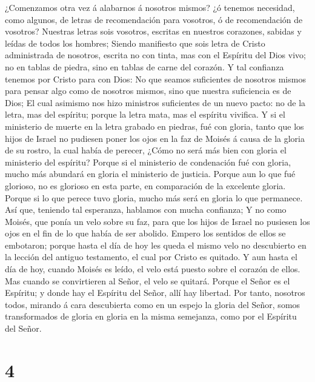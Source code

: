  ¿Comenzamos otra vez á alabarnos á nosotros mismos? ¿ó
tenemos necesidad, como algunos, de letras de recomendación para
vosotros, ó de recomendación de vosotros?  Nuestras letras
sois vosotros, escritas en nuestros corazones, sabidas y leídas de todos
los hombres;  Siendo manifiesto que sois letra de Cristo
administrada de nosotros, escrita no con tinta, mas con el Espíritu del
Dios vivo; no en tablas de piedra, sino en tablas de carne del corazón.
 Y tal confianza tenemos por Cristo para con Dios:
 No que seamos suficientes de nosotros mismos para pensar
algo como de nosotros mismos, sino que nuestra suficiencia es de Dios;
 El cual asimismo nos hizo ministros suficientes de un
nuevo pacto: no de la letra, mas del espíritu; porque la letra mata, mas
el espíritu vivifica.  Y si el ministerio de muerte en la
letra grabado en piedras, fué con gloria, tanto que los hijos de Israel
no pudiesen poner los ojos en la faz de Moisés á causa de la gloria de
su rostro, la cual había de perecer,  ¿Cómo no será más
bien con gloria el ministerio del espíritu?  Porque si el
ministerio de condenación fué con gloria, mucho más abundará en gloria
el ministerio de justicia.  Porque aun lo que fué
glorioso, no es glorioso en esta parte, en comparación de la excelente
gloria.  Porque si lo que perece tuvo gloria, mucho más
será en gloria lo que permanece.  Así que, teniendo tal
esperanza, hablamos con mucha confianza;  Y no como
Moisés, que ponía un velo sobre su faz, para que los hijos de Israel no
pusiesen los ojos en el fin de lo que había de ser abolido.
 Empero los sentidos de ellos se embotaron; porque hasta
el día de hoy les queda el mismo velo no descubierto en la lección del
antiguo testamento, el cual por Cristo es quitado.  Y aun
hasta el día de hoy, cuando Moisés es leído, el velo está puesto sobre
el corazón de ellos.  Mas cuando se convirtieren al
Señor, el velo se quitará.  Porque el Señor es el
Espíritu; y donde hay el Espíritu del Señor, allí hay libertad.
 Por tanto, nosotros todos, mirando á cara descubierta
como en un espejo la gloria del Señor, somos transformados de gloria en
gloria en la misma semejanza, como por el Espíritu del Señor.

\hypertarget{section-3}{%
\section{4}\label{section-3}}

